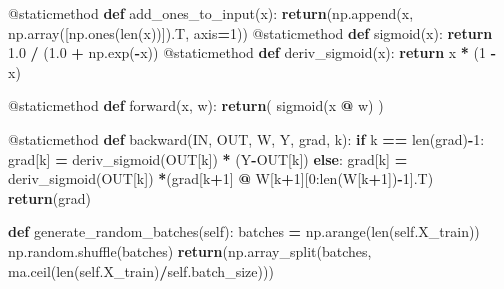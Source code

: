 \documentclass[
]{book}
\newenvironment{Shaded}{\begin{snugshade}}{\end{snugshade}}
\newcommand{\AttributeTok}[1]{\textcolor[rgb]{0.77,0.63,0.00}{#1}}
\newcommand{\BuiltInTok}[1]{#1}
\newcommand{\ControlFlowTok}[1]{\textcolor[rgb]{0.13,0.29,0.53}{\textbf{#1}}}
\newcommand{\DecValTok}[1]{\textcolor[rgb]{0.00,0.00,0.81}{#1}}
\newcommand{\FloatTok}[1]{\textcolor[rgb]{0.00,0.00,0.81}{#1}}
\newcommand{\KeywordTok}[1]{\textcolor[rgb]{0.13,0.29,0.53}{\textbf{#1}}}
\newcommand{\NormalTok}[1]{#1}
\newcommand{\OperatorTok}[1]{\textcolor[rgb]{0.81,0.36,0.00}{\textbf{#1}}}
\newcommand{\VariableTok}[1]{\textcolor[rgb]{0.00,0.00,0.00}{#1}}
\begin{document}
\begin{Shaded}
\begin{Highlighting}[]
  \AttributeTok{@staticmethod}
  \KeywordTok{def}\NormalTok{ add\_ones\_to\_input(x):}
    \ControlFlowTok{return}\NormalTok{(np.append(x, np.array([np.ones(}\BuiltInTok{len}\NormalTok{(x))]).T, axis}\OperatorTok{=}\DecValTok{1}\NormalTok{))}
  \AttributeTok{@staticmethod}
  \KeywordTok{def}\NormalTok{ sigmoid(x):}
    \ControlFlowTok{return} \FloatTok{1.0} \OperatorTok{/}\NormalTok{ (}\FloatTok{1.0} \OperatorTok{+}\NormalTok{ np.exp(}\OperatorTok{{-}}\NormalTok{x))}
  \AttributeTok{@staticmethod}
  \KeywordTok{def}\NormalTok{ deriv\_sigmoid(x):}
    \ControlFlowTok{return}\NormalTok{ x }\OperatorTok{*}\NormalTok{ (}\DecValTok{1} \OperatorTok{{-}}\NormalTok{ x)}
   
  \AttributeTok{@staticmethod}
  \KeywordTok{def}\NormalTok{ forward(x, w):}
    \ControlFlowTok{return}\NormalTok{( sigmoid(x }\OperatorTok{@}\NormalTok{ w) )}
  
  \AttributeTok{@staticmethod}
  \KeywordTok{def}\NormalTok{ backward(IN, OUT, W, Y, grad, k):}
    \ControlFlowTok{if}\NormalTok{ k }\OperatorTok{==} \BuiltInTok{len}\NormalTok{(grad)}\OperatorTok{{-}}\DecValTok{1}\NormalTok{:}
\NormalTok{      grad[k] }\OperatorTok{=}\NormalTok{ deriv\_sigmoid(OUT[k]) }\OperatorTok{*}\NormalTok{ (Y}\OperatorTok{{-}}\NormalTok{OUT[k])}
    \ControlFlowTok{else}\NormalTok{:}
\NormalTok{      grad[k] }\OperatorTok{=}\NormalTok{ deriv\_sigmoid(OUT[k]) }\OperatorTok{*}\NormalTok{(grad[k}\OperatorTok{+}\DecValTok{1}\NormalTok{] }\OperatorTok{@}\NormalTok{ W[k}\OperatorTok{+}\DecValTok{1}\NormalTok{][}\DecValTok{0}\NormalTok{:}\BuiltInTok{len}\NormalTok{(W[k}\OperatorTok{+}\DecValTok{1}\NormalTok{])}\OperatorTok{{-}}\DecValTok{1}\NormalTok{].T)}
    \ControlFlowTok{return}\NormalTok{(grad)}
    
  \KeywordTok{def}\NormalTok{ generate\_random\_batches(}\VariableTok{self}\NormalTok{):}
\NormalTok{    batches }\OperatorTok{=}\NormalTok{ np.arange(}\BuiltInTok{len}\NormalTok{(}\VariableTok{self}\NormalTok{.X\_train))}
\NormalTok{    np.random.shuffle(batches)}
    \ControlFlowTok{return}\NormalTok{(np.array\_split(batches, ma.ceil(}\BuiltInTok{len}\NormalTok{(}\VariableTok{self}\NormalTok{.X\_train)}\OperatorTok{/}\VariableTok{self}\NormalTok{.batch\_size)))}
    

\end{Highlighting}
\end{Shaded}
\end{document}
